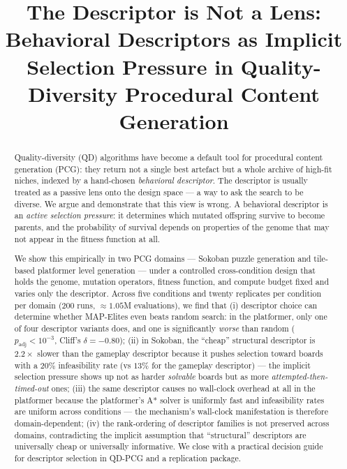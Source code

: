 \documentclass[conference]{IEEEtran}
\begin{document}
\title{The Descriptor is Not a Lens: \\
       Behavioral Descriptors as Implicit Selection Pressure
       in Quality-Diversity Procedural Content Generation}

\author{}

\maketitle

\begin{abstract}
Quality-diversity (QD) algorithms have become a default tool for
procedural content generation (PCG): they return not a single best
artefact but a whole archive of high-fit niches, indexed by a
hand-chosen \emph{behavioral descriptor}. The descriptor is usually
treated as a passive lens onto the design space --- a way to ask the
search to be diverse. We argue and demonstrate that this view is
wrong. A behavioral descriptor is an \emph{active selection
pressure}: it determines which mutated offspring survive to become
parents, and the probability of survival depends on properties of
the genome that may not appear in the fitness function at all.

We show this empirically in two PCG domains --- Sokoban puzzle
generation and tile-based platformer level generation --- under a
controlled cross-condition design that holds the genome, mutation
operators, fitness function, and compute budget fixed and varies only
the descriptor. Across five conditions and twenty replicates per
condition per domain (200 runs, $\approx 1.05$M evaluations), we
find that (i) descriptor choice can determine whether MAP-Elites
even beats random search: in the platformer, only one of four
descriptor variants does, and one is significantly \emph{worse}
than random ($p_\text{adj}<10^{-3}$, Cliff's $\delta=-0.80$);
(ii) in Sokoban, the ``cheap'' structural descriptor is
$2.2\times$ slower than the gameplay descriptor because it pushes
selection toward boards with a $20\%$ infeasibility rate (vs
$13\%$ for the gameplay descriptor) --- the implicit selection
pressure shows up not as harder \emph{solvable} boards but as more
\emph{attempted-then-timed-out} ones;
(iii) the same descriptor causes no wall-clock overhead at all in
the platformer because the platformer's A* solver is uniformly
fast and infeasibility rates are uniform across conditions ---
the mechanism's wall-clock manifestation is therefore
domain-dependent;
(iv) the rank-ordering of descriptor families is not preserved
across domains, contradicting the implicit assumption that
``structural'' descriptors are universally cheap or universally
informative. We close with a practical decision guide for
descriptor selection in QD-PCG and a replication package.
\end{abstract}
\end{document}
